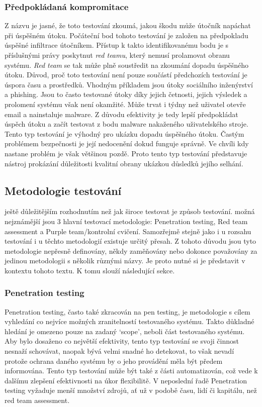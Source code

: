 \subsubsection{Předpokládaná kompromitace}
Z názvu je jasné, že toto testování zkoumá, jakou škodu může útočník napáchat při úspěšném útoku.
Počáteční bod tohoto testování je založen na předpokladu úspěšné infiltrace útočníkem.
Přístup k takto identifikovanému bodu je s příslušnými právy poskytnut \textit{red teamu}, který nemusí prolamovat obranu systému.
\textit{Red team} se tak může plně soustředit na zkoumání dopadu úspěšného útoku.
Důvod, proč toto testování není pouze součástí předchozích testování je úspora času a prostředků.
Vhodným příkladem jsou útoky sociálního inženýrství a phishing.
Jsou to často testované útoky díky jejich četnosti, jejich výsledek a prolomení systému však není okamžité.
Může trvat i týdny než uživatel otevře email a nainstaluje malware.\cite{red_team_oakley_2019}
Z důvodu efektivity je tedy lepší předpokládat úspěch útoku a začít testovat z bodu malware nakaženého uživatelského stroje.
Tento typ testování je výhodný pro ukázku dopadu úspěšného útoku.
Častým problémem bezpečnosti je její nedocenění dokud funguje správně.
Ve chvíli kdy nastane problém je však většinou pozdě.
Proto tento typ testování představuje nástroj prokázání důležitosti kvalitní obrany ukázkou důsledků jejího selhání.

\subsection{Metodologie testování}\label{subsec:metodologie-testovani}
ještě důležitějším rozhodnutím než jak široce testovat je způsob testování.
možná nejznámější jsou 3 hlavní testovací metodologie: Penetration testing, Red team assessment a Purple team/kontrolní cvičení.
Samozřejmě stejně jako i u rozsahu testování i u těchto metodologií existuje určitý přesah.
Z tohoto důvodu jsou tyto metodologie nepřesně definovány, někdy zaměňovány nebo dokonce považovány za jedinou metodologii s několik různými názvy.
Je proto nutné si je představit v kontextu tohoto textu.
K tomu slouží následující sekce.\cite{securityInteligence_pen_test_red_team_purple_team}

\subsubsection{Penetration testing}

Penetration testing, často také zkracován na pen testing, je metodologie s cílem vyhledání co nejvíce možných zranitelností testovaného systému.
Takto důkladné hledání je omezeno pouze na zadaný `scope', neboli část testovaného systému.
Aby bylo dosaženo co největší efektivity, tento typ testování se svoji činnost nesnaží schovávat, naopak bývá velmi snadné ho detekovat, to však nevadí protože ochrana daného systému by o jeho provádění měla být předem informována.
Tento typ testování může být také z části automatizován, což vede k dalšímu zlepšení efektivnosti na úkor flexibilitě.
V neposlední řadě Penetration testing vyžaduje menší množství zdrojů, ať už v podobě času, lidí či kapitálu, než red team assessment.

